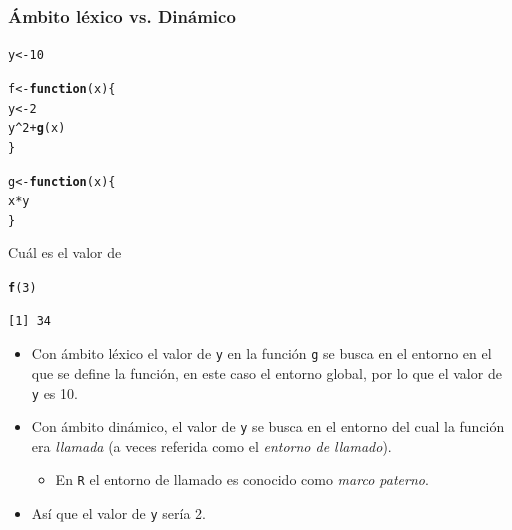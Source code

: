 \documentclass{article}\usepackage[]{graphicx}\usepackage[]{color}
\makeatletter
\newcommand{\hlnum}[1]{\textcolor[rgb]{0.686,0.059,0.569}{#1}}%
\newcommand{\hlopt}[1]{\textcolor[rgb]{0,0,0}{#1}}%
\newcommand{\hlstd}[1]{\textcolor[rgb]{0.345,0.345,0.345}{#1}}%
\newcommand{\hlkwa}[1]{\textcolor[rgb]{0.161,0.373,0.58}{\textbf{#1}}}%
\newcommand{\hlkwb}[1]{\textcolor[rgb]{0.69,0.353,0.396}{#1}}%
\newcommand{\hlkwc}[1]{\textcolor[rgb]{0.333,0.667,0.333}{#1}}%
\newcommand{\hlkwd}[1]{\textcolor[rgb]{0.737,0.353,0.396}{\textbf{#1}}}%
\newenvironment{kframe}{%
 \def\at@end@of@kframe{}%
 \ifinner\ifhmode%
  \def\at@end@of@kframe{\end{minipage}}%
  \begin{minipage}{\columnwidth}%
 \fi\fi%
 \def\FrameCommand##1{\hskip\@totalleftmargin \hskip-\fboxsep
 \colorbox{shadecolor}{##1}\hskip-\fboxsep
     \hskip-\linewidth \hskip-\@totalleftmargin \hskip\columnwidth}%
 \MakeFramed {\advance\hsize-\width
   \@totalleftmargin\z@ \linewidth\hsize
   \@setminipage}}%
 {\par\unskip\endMakeFramed%
 \at@end@of@kframe}
\newenvironment{knitrout}{}{} %
\makeatother
\begin{document}
    \subsubsection{Ámbito léxico vs. Dinámico}
\begin{knitrout}
\color{fgcolor}\begin{kframe}
\begin{alltt}
  \hlstd{y} \hlkwb{<-} \hlnum{10}

  \hlstd{f} \hlkwb{<-} \hlkwa{function}\hlstd{(}\hlkwc{x}\hlstd{) \{}
    \hlstd{y} \hlkwb{<-} \hlnum{2}
    \hlstd{y}\hlopt{^}\hlnum{2} \hlopt{+} \hlkwd{g}\hlstd{(x)}
  \hlstd{\}}

  \hlstd{g} \hlkwb{<-} \hlkwa{function}\hlstd{(}\hlkwc{x}\hlstd{) \{}
    \hlstd{x}\hlopt{*}\hlstd{y}
  \hlstd{\}}
\end{alltt}
\end{kframe}
\end{knitrout}
    
    Cuál es el valor de 
\begin{knitrout}
\color{fgcolor}\begin{kframe}
\begin{alltt}
  \hlkwd{f}\hlstd{(}\hlnum{3}\hlstd{)}
\end{alltt}
\begin{verbatim}
[1] 34
\end{verbatim}
\end{kframe}
\end{knitrout}

    \begin{itemize}
      \item Con ámbito léxico el valor de \texttt{y} en la función \texttt{g} se busca en el entorno en el que se define la función, en este caso el entorno global, por lo que el valor de \texttt{y} es 10.
      \item Con ámbito dinámico, el valor de \texttt{y} se busca en el entorno del cual la función era \emph{llamada} (a veces referida como el \emph{entorno de llamado}).
      \begin{itemize}
        \item En \texttt{R} el entorno de llamado es conocido como \emph{marco paterno}.
      \end{itemize}
      \item Así que el valor de \texttt{y} sería 2.
    \end{itemize}
    
\end{document}
